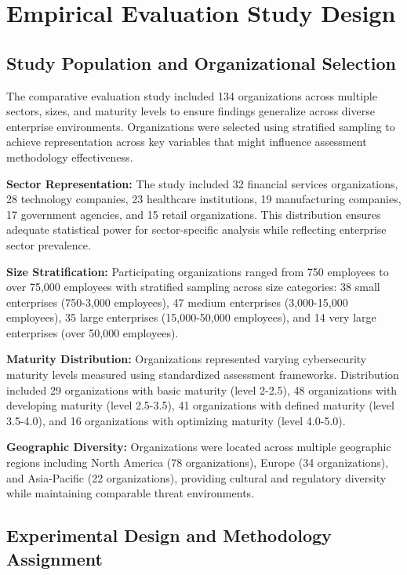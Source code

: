 \documentclass[10pt, twocolumn]{article}
\begin{document}
\section{Empirical Evaluation Study Design}

\subsection{Study Population and Organizational Selection}

The comparative evaluation study included 134 organizations across multiple sectors, sizes, and maturity levels to ensure findings generalize across diverse enterprise environments. Organizations were selected using stratified sampling to achieve representation across key variables that might influence assessment methodology effectiveness.

\textbf{Sector Representation:} The study included 32 financial services organizations, 28 technology companies, 23 healthcare institutions, 19 manufacturing companies, 17 government agencies, and 15 retail organizations. This distribution ensures adequate statistical power for sector-specific analysis while reflecting enterprise sector prevalence.

\textbf{Size Stratification:} Participating organizations ranged from 750 employees to over 75,000 employees with stratified sampling across size categories: 38 small enterprises (750-3,000 employees), 47 medium enterprises (3,000-15,000 employees), 35 large enterprises (15,000-50,000 employees), and 14 very large enterprises (over 50,000 employees).

\textbf{Maturity Distribution:} Organizations represented varying cybersecurity maturity levels measured using standardized assessment frameworks. Distribution included 29 organizations with basic maturity (level 2-2.5), 48 organizations with developing maturity (level 2.5-3.5), 41 organizations with defined maturity (level 3.5-4.0), and 16 organizations with optimizing maturity (level 4.0-5.0).

\textbf{Geographic Diversity:} Organizations were located across multiple geographic regions including North America (78 organizations), Europe (34 organizations), and Asia-Pacific (22 organizations), providing cultural and regulatory diversity while maintaining comparable threat environments.

\subsection{Experimental Design and Methodology Assignment}
\end{document}
